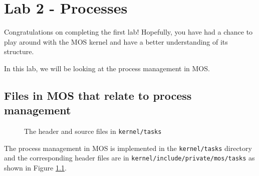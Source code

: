 \chapter{Lab 2 - Processes}

Congratulations on completing the first lab! Hopefully, you have had a chance to play
around with the MOS kernel and have a better understanding of its structure.

In this lab, we will be looking at the process management in MOS.

\section{Files in MOS that relate to process management}

\begin{figure}[ht]
    \centering
    \caption{The header and source files in \texttt{kernel/tasks}}
    \label{fig:mos-process-management-files}
\end{figure}

The process management in MOS is implemented in the \texttt{kernel/tasks} directory and the
corresponding header files are in \texttt{kernel/include/private/mos/tasks} as shown in
Figure \ref{fig:mos-process-management-files}.

